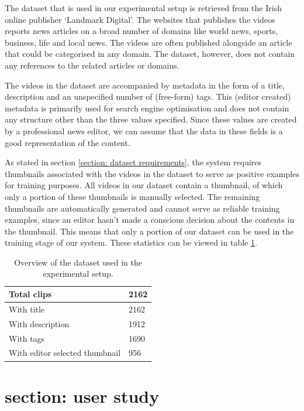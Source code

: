 \documentclass{../resources/sig-alternate-05-2015}
\begin{document}
The dataset that is used in our experimental setup is retrieved from the Irish online publisher `Landmark Digital'. The websites that publishes the videos reports news articles on a broad number of domains like world news, sports, business, life and local news. The videos are often published alongside an article that could be categorised in any domain. The dataset, however, does not contain any references to the related articles or domains.

The videos in the dataset are accompanied by metadata in the form of a title, description and an unspecified number of (free-form) tags. This (editor created) metadata is primarily used for search engine optimisation and does not contain any structure other than the three values specified. Since these values are created by a professional news editor, we can assume that the data in these fields is a good representation of the content.

As stated in section \ref{section: dataset requirements}, the system requires thumbnails associated with the videos in the dataset to serve as positive examples for training purposes. All videos in our dataset contain a thumbnail, of which only a portion of these thumbnails is manually selected. The remaining thumbnails are automatically generated and cannot serve as reliable training examples, since an editor hasn't made a conscious decision about the contents in the thumbnail. This means that only a portion of our dataset can be used in the training stage of our system. These statistics can be viewed in table \ref{table:dataset}.

\begin{table}[h]
\caption{Overview of the dataset used in the experimental setup.}
\label{table:dataset}
\begin{tabular}{ll}
Total clips                    & 2162 \\ \hline
With title                     & 2162 \\
With description               & 1912 \\
With tags                      & 1690 \\
With editor selected thumbnail & 956 
\end{tabular}
\end{table}


\section{section: user study}
\label{section: user study}
\end{document}
